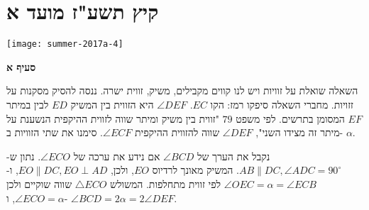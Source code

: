
\np

\section{קיץ תשע"ז מועד א}

\begin{center}
\texttt{[image: summer-2017a-4]}
\end{center}

\vspace{-3ex}

\textbf{סעיף א}

השאלה שואלת על זוויות ויש לנו קווים מקבילים, משיק, זווית ישרה. ננסה להסיק מסקנות על זזויות. מחברי השאלה סיפקו רמז: הקו 
$EC$.
$\angle DEF$
היא הזווית בין המשיק
$ED$
לבין במיתר 
$EF$
המסומן בתרשים. לפי משפט 
$79$
"זווית בין משיק ומיתר שווה לזווית ההיקפית הנשענת על מיתר זה מצידו השני",
$\angle DEF$
שווה להזווית ההיקפית
$\angle ECF$.
סימנו את שתי הזוויות ב-%
$\alpha$.

נקבל את הערך של
$\angle BCD$
אם נידע את ערכה של
$\angle ECO$.
נתון ש-%
$AB\|DC,\angle ADC=90^\circ$.
המשיק מאונך לרדיוס
$EO$,
ולכן, 
$EO\|DC,EO\perp AD$,
ו-%
$\angle OEC=\alpha=\angle ECB$
לפי זווית מתחלפות. המשולש
$\triangle ECO$
שווה שוקיים ולכן
$\angle ECO=\alpha$,
ו-%
$\angle BCD=2\alpha= 2\angle{DEF}$.

